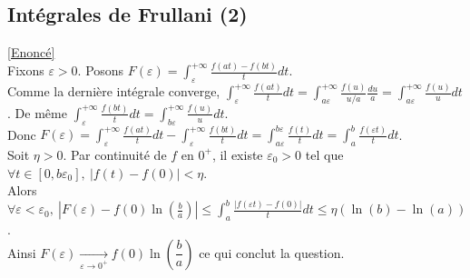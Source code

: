 \documentclass{book}
\begin{document}
	\subsection{Intégrales de Frullani (2) }
	\label{Intégrales de Frullani (2) corrigé}
	\textcolor{blue}{\hyperref[Intégrales de Frullani (2)]{[Enoncé]}}\\
	Fixons $\varepsilon>0$. Posons $F(\varepsilon)=\displaystyle\int_\varepsilon^{+\infty}\frac{f(at)-f(bt)}{t}dt$.\\
	Comme la dernière intégrale converge, $\displaystyle\int_\varepsilon^{+\infty}\frac{f(at)}{t}dt=\int_{a\varepsilon}^{+\infty}\frac{f(u)}{u/a}\frac{du}{a}=\int_{a\varepsilon}^{+\infty}\frac{f(u)}{u}dt$. De même $\displaystyle\int_\varepsilon^{+\infty}\frac{f(bt)}{t}dt=\int_{b\varepsilon}^{+\infty}\frac{f(u)}{u}dt$.\\
	Donc $F(\varepsilon)=\displaystyle\int_\varepsilon^{+\infty}\frac{f(at)}{t}dt-\int_\varepsilon^{+\infty}\frac{f(bt)}{t}dt=\int_{a\varepsilon}^{b\varepsilon}\frac{f(t)}{t}dt=\int_a^b\frac{f(\varepsilon t)}{t}dt$.\\
	Soit $\eta>0$. Par continuité de $f$ en $0^+$, il existe $\varepsilon_0>0$ tel que $\forall t\in [0,b\varepsilon_0],\ |f(t)-f(0)|<\eta$.\\
	Alors $\forall \varepsilon<\varepsilon_0,\ \displaystyle\left|F(\varepsilon)-f(0)\ln\left(\frac{b}{a}\right)\right|\leq\int_a^b\frac{|f(\varepsilon t)-f(0)|}{t}dt\leq \eta(\ln(b)-\ln(a))$.\\
	Ainsi $F(\varepsilon)\underset{\varepsilon\to 0^+}\longrightarrow f(0)\ln\left(\dfrac{b}{a}\right)$ ce qui conclut la question.
	
\end{document}
